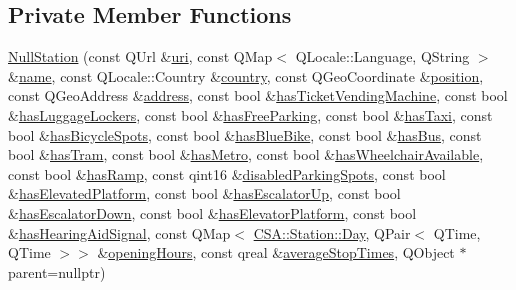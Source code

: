 \subsection*{Private Member Functions}
\begin{DoxyCompactItemize}
\item 
\mbox{\hyperlink{classCSA_1_1NullStation_ac383e83e8ad47350e82b68a7c6e7b980}{Null\+Station}} (const Q\+Url \&\mbox{\hyperlink{classCSA_1_1Station_addca2c54d5e9ce61c4ef9c3ee9ff4100}{uri}}, const Q\+Map$<$ Q\+Locale\+::\+Language, Q\+String $>$ \&\mbox{\hyperlink{classCSA_1_1Station_ad4442763fc108cde8368260119c007da}{name}}, const Q\+Locale\+::\+Country \&\mbox{\hyperlink{classCSA_1_1Station_ac54cea5fde8ba6e2367f0317965d9147}{country}}, const Q\+Geo\+Coordinate \&\mbox{\hyperlink{classCSA_1_1Station_a94249de9cc38d704eb6e77aca24daaea}{position}}, const Q\+Geo\+Address \&\mbox{\hyperlink{classCSA_1_1Station_a82482b7595c3a587be4d2473eeff2d42}{address}}, const bool \&\mbox{\hyperlink{classCSA_1_1Station_a9e3f2a57d2e3793a375b8c3a7182ec7b}{has\+Ticket\+Vending\+Machine}}, const bool \&\mbox{\hyperlink{classCSA_1_1Station_aaa684a525fd9cef75108a1fe52ea5053}{has\+Luggage\+Lockers}}, const bool \&\mbox{\hyperlink{classCSA_1_1Station_a89e7b6e8612bef71f123986164aa1ba4}{has\+Free\+Parking}}, const bool \&\mbox{\hyperlink{classCSA_1_1Station_a886f635564cc01430552529d07527343}{has\+Taxi}}, const bool \&\mbox{\hyperlink{classCSA_1_1Station_a659f45a05d2920e6141db42d0fe9c7ff}{has\+Bicycle\+Spots}}, const bool \&\mbox{\hyperlink{classCSA_1_1Station_af3be093b4e7bbad8c76de068804765e6}{has\+Blue\+Bike}}, const bool \&\mbox{\hyperlink{classCSA_1_1Station_a02fa7a1b47bc2b7170f8817d49d6f992}{has\+Bus}}, const bool \&\mbox{\hyperlink{classCSA_1_1Station_ab01f8eb60d105cd77b5489e5b6746671}{has\+Tram}}, const bool \&\mbox{\hyperlink{classCSA_1_1Station_af51e8389ffadbbe19ef2d485434d94b5}{has\+Metro}}, const bool \&\mbox{\hyperlink{classCSA_1_1Station_a72be06dc6901f2707b22aa055e783a9f}{has\+Wheelchair\+Available}}, const bool \&\mbox{\hyperlink{classCSA_1_1Station_a07526fe7c2d2f0c47b8920d830f2935c}{has\+Ramp}}, const qint16 \&\mbox{\hyperlink{classCSA_1_1Station_a89962b963e33d1a5db45f22d6a60834e}{disabled\+Parking\+Spots}}, const bool \&\mbox{\hyperlink{classCSA_1_1Station_a883e232e28352571f41095b31e3cac0e}{has\+Elevated\+Platform}}, const bool \&\mbox{\hyperlink{classCSA_1_1Station_ae6fa7ccf3c6ca7e819d5e795841afb08}{has\+Escalator\+Up}}, const bool \&\mbox{\hyperlink{classCSA_1_1Station_ac0cb1e889a3c323dca9679902a9ac1c8}{has\+Escalator\+Down}}, const bool \&\mbox{\hyperlink{classCSA_1_1Station_a7924a558376c91a293e0bfe0cc76c13b}{has\+Elevator\+Platform}}, const bool \&\mbox{\hyperlink{classCSA_1_1Station_ae60274e5ab0ce2e983067122900389a4}{has\+Hearing\+Aid\+Signal}}, const Q\+Map$<$ \mbox{\hyperlink{classCSA_1_1Station_aa160d0de40db0583099b5986dea1cd67}{C\+S\+A\+::\+Station\+::\+Day}}, Q\+Pair$<$ Q\+Time, Q\+Time $>$$>$ \&\mbox{\hyperlink{classCSA_1_1Station_aafe81d261ad07910a07dab3e21264174}{opening\+Hours}}, const qreal \&\mbox{\hyperlink{classCSA_1_1Station_aa8f1c3bfa7b4a3ad9ccc805ff7a2b931}{average\+Stop\+Times}}, Q\+Object $\ast$parent=nullptr)
\end{DoxyCompactItemize}
